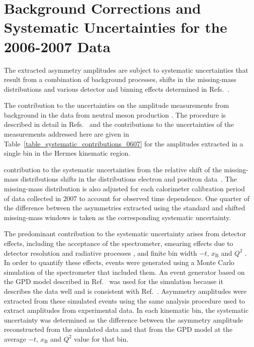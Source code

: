 \section{Background Corrections and Systematic Uncertainties for the
  2006-2007 Data}
The extracted asymmetry amplitudes are subject to systematic uncertainties that
result from a combination of background processes, 
shifts in the missing-mass distributions and various detector and binning
effects determined in  Refs.~\cite{Air08,Air09}.

The contribution to the uncertainties on the amplitude measurements
 from background in the data from neutral meson
production . The procedure  is described in detail in
Refs.~\cite{Air08,Air09} and the contributions to the uncertainties of
the measurements addressed here are given in
Table~\ref{table_systematic_contributions_0607} for the amplitudes
extracted in a single bin in the H{\sc ermes} kinematic
region. 

 contribution to the systematic uncertainties from the relative shift of the
missing-mass distributions  shifts in the
distributions  electron and positron data~\cite{Zei09,Bur10}. The
missing-mass distribution is also adjusted for each calorimeter calibration period of data
collected in 2007 to account for  observed time dependence. One
quarter of the difference between the asymmetries extracted using the standard
and shifted missing-mass windows is taken as the corresponding systematic
uncertainty. 

The predominant contribution to the systematic uncertainty arises from detector
effects, including the acceptance of the spectrometer, smearing
effects due to detector resolution and radiative processes , and
 finite bin width  $-t$, $x_{\textrm{B}}$ and $Q^{2}$ . In order to quantify
these effects, events were generated using a Monte Carlo simulation of
the spectrometer that included them. An event
generator based on the GPD model described in Ref.~\cite{Van99,Goe01} was
used for the simulation because it describes the data well and is
consistent with Ref.~\cite{Air09}. Asymmetry amplitudes were extracted
from these simulated events using the same analysis procedure used to
extract amplitudes from experimental data. In each kinematic bin, the
systematic uncertainty was determined as the difference between the asymmetry amplitude reconstructed from the simulated data and that
 from the GPD model at the average $-t$, $x_{\textrm{B}}$ and
$Q^{2}$ value for that bin.


